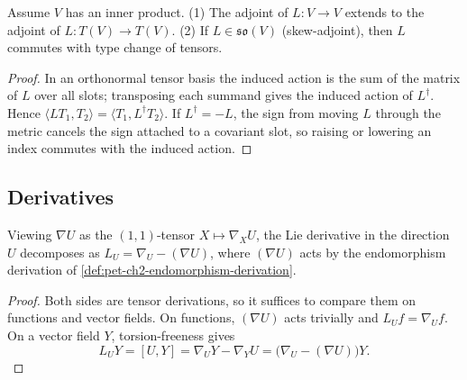 \begin{proposition}
  \label{prop:pet-ch2-endomorphism-adjoint-type-change}


  Assume $V$ has an inner product. (1) The adjoint of $L:V\to V$ extends to
  the adjoint of $L:T(V)\to T(V)$. (2) If $L\in\mathfrak{so}(V)$ (skew-adjoint),
  then $L$ commutes with type change of tensors.
\end{proposition}
\begin{proof}

  \sketch
  In an orthonormal tensor
  basis the induced action is the sum of the matrix of $L$ over all slots;
  transposing each summand gives the induced action of $L^\dagger$. Hence
  $\langle LT_1,T_2\rangle=\langle T_1,L^\dagger T_2\rangle$. If
  $L^\dagger=-L$, the sign from moving $L$ through the metric cancels the
  sign attached to a covariant slot, so raising or lowering an index commutes
  with the induced action.
\end{proof}

\subsection{Derivatives}

\begin{proposition}
  \label{prop:pet-ch2-lie-derivative-as-endomorphism-derivation}


  Viewing $\nabla U$ as the $(1,1)$-tensor $X\mapsto\nabla_XU$, the Lie
  derivative in the direction $U$ decomposes as $L_U=\nabla_U-(\nabla U)$,
  where $(\nabla U)$ acts by the endomorphism derivation of
  \cref{def:pet-ch2-endomorphism-derivation}.
\end{proposition}
\begin{proof}

  \sketch
  Both sides are
  tensor derivations, so it suffices to compare them on functions and vector
  fields. On functions, $(\nabla U)$ acts trivially and
  $L_Uf=\nabla_Uf$. On a vector field $Y$, torsion-freeness gives
  \[
    L_UY=[U,Y]=\nabla_UY-\nabla_YU
      =\big(\nabla_U-(\nabla U)\big)Y.
  \]
\end{proof}


